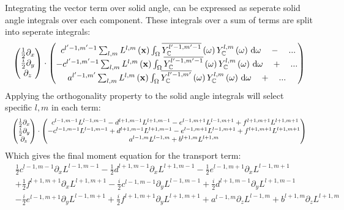 Integrating the vector term over solid angle, can be expressed as seperate solid angle integrals over each component. These integrals over a sum of terms are split into seperate integrals:
\begin{align*}
\begin{pmatrix}
\frac{1}{2}\partial_x\\
\frac{i}{2}\partial_y\\
\partial_z
\end{pmatrix}
\cdot
\begin{pmatrix}
\ c^{l'-1, m'-1}\sum_{l,m}{L^{l,m}\left(\mathbf{x}\right )\int_\Omega{\overline{Y_{\mathbb{C}}^{l'-1,m'-1}}\left(\omega\right)Y_{\mathbb{C}}^{l,m}\left(\omega\right)\,\mathrm{d}\omega}} \quad - \quad ...\\
-c^{l'-1, m'-1}\sum_{l,m}{L^{l,m}\left(\mathbf{x}\right )\int_\Omega{\overline{Y_{\mathbb{C}}^{l'-1,m'-1}}\left(\omega\right)Y_{\mathbb{C}}^{l,m}\left(\omega\right)\,\mathrm{d}\omega}} \quad + \quad ... \\
a^{l'-1, m'}\sum_{l,m}{L^{l,m}\left(\mathbf{x}\right )\int_\Omega{\overline{Y_{\mathbb{C}}^{l'-1,m'}}\left(\omega\right)Y_{\mathbb{C}}^{l,m}\left(\omega\right)\,\mathrm{d}\omega}} \quad + \quad ...
\end{pmatrix}
\end{align*}
Applying the orthogonality property to the solid angle integrals will select specific $l,m$ in each term:
\begin{equation*}
\resizebox{1.0\hsize}{!}{$
\begin{pmatrix}
\frac{1}{2}\partial_x\\
\frac{i}{2}\partial_y\\
\partial_z
\end{pmatrix}
\cdot
\begin{pmatrix}
\ c^{l-1, m-1}L^{l-1,m-1} - d^{l+1, m-1}L^{l+1,m-1} - e^{l-1, m+1}L^{l-1,m+1} + f^{l+1, m+1}L^{l+1,m+1}\\
-c^{l-1, m-1}L^{l-1,m-1} + d^{l+1, m-1}L^{l+1,m-1} - e^{l-1, m+1}L^{l-1,m+1} + f^{l+1, m+1}L^{l+1,m+1} \\
a^{l-1, m}L^{l-1,m}+b^{l+1, m}L^{l+1,m}
\end{pmatrix}
$}
\end{equation*}
Which gives the final moment equation for the transport term:
\begin{align}
&
\frac{1}{2}c^{l-1, m-1}\partial_x L^{l-1,m-1}
-\frac{1}{2}d^{l+1, m-1}\partial_x L^{l+1,m-1}
-\frac{1}{2}e^{l-1, m+1}\partial_x L^{l-1,m+1}
\nonumber
\\
&
+\frac{1}{2}f^{l+1, m+1}\partial_x L^{l+1,m+1}
-\frac{i}{2}c^{l-1, m-1}\partial_y L^{l-1,m-1}
+\frac{i}{2}d^{l+1, m-1}\partial_y L^{l+1,m-1}
\nonumber
\\
&
-\frac{i}{2}e^{l-1, m+1}\partial_y L^{l-1,m+1}
+\frac{i}{2}f^{l+1, m+1}\partial_y L^{l+1,m+1}
+
a^{l-1, m}\partial_z L^{l-1,m}+b^{l+1, m}\partial_z L^{l+1,m}
\label{eq:sh_complex_transport}
\end{align}

